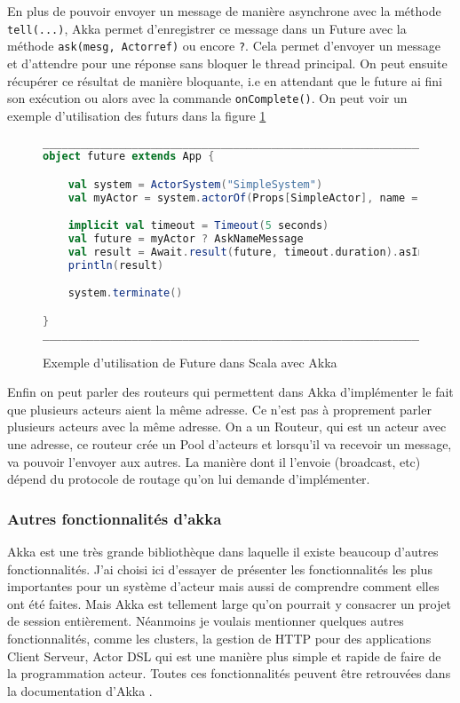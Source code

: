 \documentclass[11pt, a4paper]{article}
\begin{document}
\par En plus de pouvoir envoyer un message de manière asynchrone avec la méthode \texttt{tell(...)}, Akka permet d'enregistrer ce message dans un Future avec la méthode \texttt{ask(mesg, Actorref)} ou encore \texttt{?}. Cela permet d'envoyer un message et d'attendre pour une réponse sans bloquer le thread principal. On peut ensuite récupérer ce résultat de manière bloquante, i.e en attendant que le future ai fini son exécution ou alors avec la commande \texttt{onComplete()}. On peut voir un exemple d'utilisation des futurs dans la figure \ref{futur}
\newline 

\begin{figure}[ht]
\centering
\begin{lstlisting}[language=scala]
__________________________________________________________________________
object future extends App {

	val system = ActorSystem("SimpleSystem")
	val myActor = system.actorOf(Props[SimpleActor], name = "myActor")

	implicit val timeout = Timeout(5 seconds)
	val future = myActor ? AskNameMessage
	val result = Await.result(future, timeout.duration).asInstanceOf[String]
	println(result)

	system.terminate()

}
__________________________________________________________________________
\end{lstlisting}
\caption{Exemple d'utilisation de Future dans Scala avec Akka}
\label{futur}
\end{figure}

\par Enfin on peut parler des routeurs qui permettent dans Akka d'implémenter le fait que plusieurs acteurs aient la même adresse. Ce n'est pas à proprement parler plusieurs acteurs avec la même adresse. On a un Routeur, qui est un acteur avec une adresse, ce routeur crée un Pool d'acteurs et lorsqu'il va recevoir un message, va pouvoir l'envoyer aux autres. La manière dont il l'envoie (broadcast, etc) dépend du protocole de routage qu'on lui demande d'implémenter.

\subsubsection{Autres fonctionnalités d'akka}
Akka est une très grande bibliothèque dans laquelle il existe beaucoup d'autres fonctionnalités. J'ai choisi ici d'essayer de présenter les fonctionnalités les plus importantes pour un système d'acteur mais aussi de comprendre comment elles ont été faites. Mais Akka est tellement large qu'on pourrait y consacrer un projet de session entièrement. Néanmoins je voulais mentionner quelques autres fonctionnalités, comme les clusters, la gestion de HTTP pour des applications Client Serveur, Actor DSL qui est une manière plus simple et rapide de faire de la programmation acteur. Toutes ces fonctionnalités peuvent être retrouvées dans la documentation d'Akka \cite{akka}.
\end{document}

